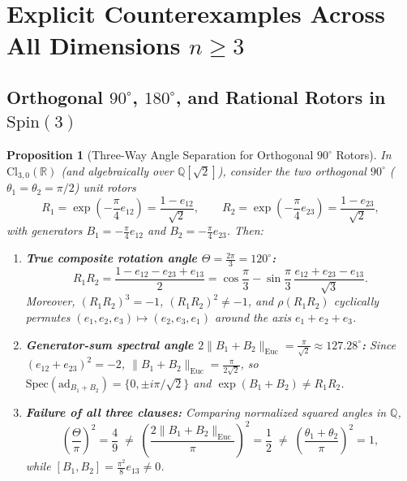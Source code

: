 \documentclass[11pt]{article}
\newtheorem{proposition}[theorem]{Proposition}
\theoremstyle{definition}
\newcommand{\Cl}{\mathrm{Cl}}
\newcommand{\Spin}{\mathrm{Spin}}
\newcommand{\Spec}{\mathrm{Spec}}
\newcommand{\ad}{\mathrm{ad}}
\newcommand{\Euc}{\mathrm{Euc}}
\begin{document}
\section{Explicit Counterexamples Across All Dimensions \texorpdfstring{$n \ge 3$}{n >= 3}}

\subsection{Orthogonal \texorpdfstring{$90^\circ$}{90-degree}, \texorpdfstring{$180^\circ$}{180-degree}, and Rational Rotors in \texorpdfstring{$\Spin(3)$}{Spin(3)}}

\begin{proposition}[Three-Way Angle Separation for Orthogonal $90^\circ$ Rotors]\label{prop:90deg}
In $\Cl_{3,0}(\mathbb{R})$ (and algebraically over $\mathbb{Q}[\sqrt{2}]$), consider the two
orthogonal $90^\circ$ ($\theta_1 = \theta_2 = \pi/2$) unit rotors
\begin{equation}
  R_1 = \exp\!\left(-\frac{\pi}{4} e_{12}\right) = \frac{1 - e_{12}}{\sqrt{2}}, \qquad
  R_2 = \exp\!\left(-\frac{\pi}{4} e_{23}\right) = \frac{1 - e_{23}}{\sqrt{2}},
\end{equation}
with generators $B_1 = -\frac{\pi}{4} e_{12}$ and $B_2 = -\frac{\pi}{4} e_{23}$. Then:
\begin{enumerate}
  \item \textbf{True composite rotation angle $\Theta = \frac{2\pi}{3} = 120^\circ$:}
    \begin{equation}
      R_1 R_2 = \frac{1 - e_{12} - e_{23} + e_{13}}{2}
      = \cos\frac{\pi}{3} - \sin\frac{\pi}{3}\,
        \frac{e_{12} + e_{23} - e_{13}}{\sqrt{3}}.
    \end{equation}
    Moreover, $(R_1 R_2)^3 = -1$, $(R_1 R_2)^2 \neq -1$, and $\rho(R_1 R_2)$ cyclically
    permutes $(e_1, e_2, e_3) \mapsto (e_2, e_3, e_1)$ around the axis $e_1 + e_2 + e_3$.
  \item \textbf{Generator-sum spectral angle $2\|B_1 + B_2\|_{\Euc} = \frac{\pi}{\sqrt{2}}
    \approx 127.28^\circ$:} Since $(e_{12} + e_{23})^2 = -2$, $\|B_1 + B_2\|_{\Euc} =
    \frac{\pi}{2\sqrt{2}}$, so $\Spec(\ad_{B_1 + B_2}) = \{0, \pm i\pi/\sqrt{2}\}$ and
    $\exp(B_1 + B_2) \neq R_1 R_2$.
  \item \textbf{Failure of all three clauses:} Comparing normalized squared angles in $\mathbb{Q}$,
    \begin{equation}
      \left(\frac{\Theta}{\pi}\right)^2 = \frac{4}{9} \;\neq\;
      \left(\frac{2\|B_1 + B_2\|_{\Euc}}{\pi}\right)^2 = \frac{1}{2} \;\neq\;
      \left(\frac{\theta_1 + \theta_2}{\pi}\right)^2 = 1,
    \end{equation}
    while $[B_1, B_2] = \frac{\pi^2}{8} e_{13} \neq 0$.
\end{enumerate}
\end{proposition}
\end{document}
